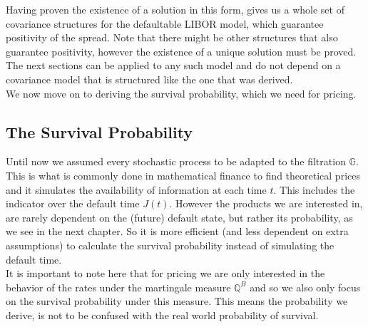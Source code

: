 \documentclass[12pt]{article}
\begin{document}
	
	Having proven the existence of a solution in this form, gives us a whole set of covariance structures for the defaultable LIBOR model, which guarantee positivity of the spread. Note that there might be other structures that also guarantee positivity, however the existence of a unique solution must be proved.\\
	The next sections can be applied to any such model and do not depend on a covariance model that is structured like the one that was derived.\\
	We now move on to deriving the survival probability, which we need for pricing.
	
	
	\subsection{The Survival Probability}
	Until now we assumed every stochastic process to be adapted to the filtration $\mathbb{G}$. This is what is commonly done in mathematical finance to find theoretical prices and it simulates the availability of  information at each time $t$. This includes the indicator over the default time $J(t)$. However the products we are interested in, are rarely dependent on the (future) default state, but rather its probability, as we see in the next chapter. So it is more efficient (and less dependent on extra assumptions) to calculate the survival probability instead of simulating the default time.\\
	
	It is important to note here that for pricing we are only interested in the behavior of the rates under the martingale measure $\mathbb{Q}^B$ and so we also only focus on the survival probability under this measure. This means the probability we derive, is not to be confused with the real world probability of survival.\\
	
\end{document}
